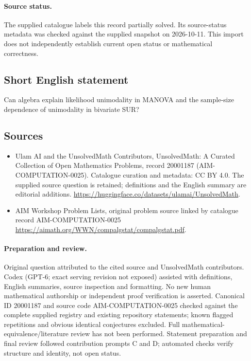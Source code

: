 \documentclass[11pt]{article}
\begin{document}
\paragraph{Source status.}
The supplied catalogue labels this record partially solved. Its source-status metadata was checked against the supplied snapshot on 2026-10-11. This import does not independently establish current open status or mathematical correctness.
\subsection{Short English statement}
Can algebra explain likelihood unimodality in MANOVA and the sample-size dependence of unimodality in bivariate SUR?
\subsection{Sources}
\begin{itemize}
\item[\hypertarget{source:20001187:1}{S1}] Ulam AI and the UnsolvedMath Contributors, UnsolvedMath: A Curated Collection of Open Mathematics Problems, record 20001187 (AIM-COMPUTATION-0025). Catalogue curation and metadata: CC BY 4.0. The supplied source question is retained; definitions and the English summary are editorial additions.
\url{https://huggingface.co/datasets/ulamai/UnsolvedMath}.
\item[\hypertarget{source:20001187:2}{S2}] AIM Workshop Problem Lists, original problem source linked by catalogue record AIM-COMPUTATION-0025
\url{https://aimath.org/WWN/compalgstat/compalgstat.pdf}.
\end{itemize}
\paragraph{Preparation and review.}
Original question attributed to the cited source and UnsolvedMath contributors. Codex (GPT-6; exact serving revision not exposed) assisted with definitions, English summaries, source inspection and formatting. No new human mathematical authorship or independent proof verification is asserted. Canonical ID 20001187 and source code AIM-COMPUTATION-0025 checked against the complete supplied registry and existing repository statements; known flagged repetitions and obvious identical conjectures excluded. Full mathematical-equivalence/literature review has not been performed. Statement preparation and final review followed contribution prompts C and D; automated checks verify structure and identity, not open status.
\label{end:20001187}
\end{document}
